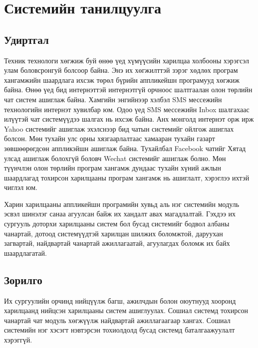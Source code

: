 
\chapter{Системийн танилцуулга} %
\label{Chapter1} %


\newcommand{\keyword}[1]{\textbf{#1}}
\newcommand{\tabhead}[1]{\textbf{#1}}
\newcommand{\code}[1]{\texttt{#1}}
\newcommand{\file}[1]{\texttt{\bfseries#1}}
\newcommand{\option}[1]{\texttt{\itshape#1}}

\section{Удиртгал}
Техник технологи хөгжиж буй өнөө үед хүмүүсийн харилцаа холбооны
хэрэгсэл улам боловсронгуй болсоор байна. Энэ их хөгжилттэй зэрэг хөдлөх
програм хангамжийн шаардлага ихсэж төрөл бүрийн аппликейшн програмууд
хөгжиж байна. Өнөө үед бид интернэттэй интернэтгүй орчноос шалтгаалан
олон төрлийн чат систем ашиглаж байна. Хамгийн энгийнээр
хэлбэл SMS мессежийн технологийн интернэт хувилбар юм. Одоо үед SMS
мессежийн Inbox шалгахаас илүүтэй чат системүүдээ шалгах нь ихсэж байна.
Анх монголд интернэт орж ирж Yahoo системийг ашиглаж эхэлснээр бид чатын
системийг ойлгож ашиглах болсон. Мөн тухайн улс орны хязгаарлалтаас
хамааран тухайн газарт зөвшөөрөгдсөн аппликэйшн ашиглаж байна. Тухайлбал
Facebook чатийг Хятад улсад ашиглаж болохгүй боловч Wechat системийг
ашиглаж болно. Мөн түүнчлэн олон төрлийн програм хангамж дундаас
тухайн хүний ажлын шаардлагад тохирсон харилцааны програм хангамж нь
ашиглалт, хэрэглээ ихтэй чиглэл юм.
 

Харин харилцааны аппликейшн програмийн хувьд
аль нэг системийн модуль эсвэл шинэлэг санаа агуулсан байж их хандалт
авах магадлалтай. Гэхдээ их сургууль доторхи харилцааны
систем бол бусад системийг бодвол албаны чанартай, дотоод системүүдтэй
харилцан шилжих боломжтой, даруухан загвартай, найдвартай чанартай
ажиллагаатай, агуулагдах боломж их байх шаардлагатай.

\section{Зорилго}
Их сургуулийн орчинд нийцүүлж багш, ажилчдын болон оюутнууд хооронд харилцаанд нийцсэн харилцааны систем ашиглуулах. Сошиал системд тохирсон чанартай чат модуль хөгжүүлж найдвартай ажиллагаагаар хангах. Сошиал системийн нэг хэсэгт нэвтэрсэн тохиолдолд бусад системд баталгаажуулалт хэрэггүй.

